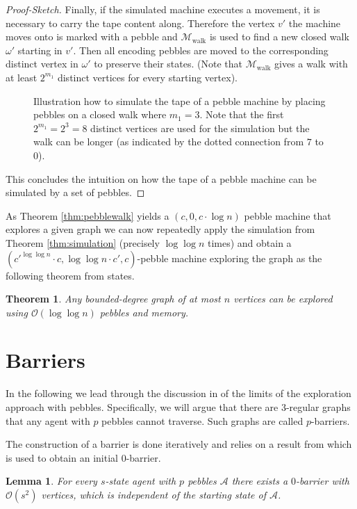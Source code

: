 \documentclass[oneside]{scrartcl}
\newtheorem{thm}{Theorem}
\newtheorem{lem}{Lemma}
\begin{document}
\begin{proof}[Proof-Sketch]
  Finally, if the simulated machine executes a movement, it is necessary to
  carry the tape content along. Therefore the vertex $v'$ the machine moves
  onto is marked with a pebble and $\mathcal{M}_{\text{walk}}$ is used to find
  a new closed walk $\omega'$ starting in $v'$. Then all encoding pebbles are
  moved to the corresponding distinct vertex in $\omega'$ to preserve their
  states. (Note that $\mathcal{M}_{\text{walk}}$ gives a walk with at least
  $2^{m_{1}}$ distinct vertices for every starting vertex).
  \begin{figure}
    \begin{center}
      \resizebox{0.6\textwidth}{!}{}
    \end{center}
    \caption{Illustration how to simulate the tape of a pebble machine by
      placing pebbles on a closed walk where $m_{1} = 3$. Note that the first
      $2^{m_{1}}=2^{3}=8$ distinct vertices are used for the simulation but the
    walk can be longer (as indicated by the dotted connection from $7$ to $0$).}
    \label{fig:tapesim}
  \end{figure}
  This concludes the intuition on how the tape of a pebble machine can be
  simulated by a set of pebbles.
\end{proof}

As Theorem \ref{thm:pebblewalk} yields a $(c,0,c\cdot\log n)$ pebble machine
that explores a given graph we can now repeatedly apply the simulation
from Theorem \ref{thm:simulation} (precisely $\log\log n$ times) and obtain
a $(c'^{\log\log n}\cdot c, \log\log n\cdot c', c)$-pebble machine exploring
the graph as the following theorem from \cite{pebbles} states.
\begin{thm}
  Any bounded-degree graph of at most $n$ vertices can be explored using
  $\mathcal{O}(\log \log n)$ pebbles and memory.
\end{thm}

\section{Barriers}
In the following we lead through the discussion in \cite{pebbles} of the limits
of the exploration approach with pebbles. Specifically, we will argue that
there are 3-regular graphs that any agent with $p$ pebbles cannot traverse.
Such graphs are called $p$-barriers.

The construction of a barrier is done iteratively and relies on a result from
\cite{0barrier} which is used to obtain an initial $0$-barrier.
\begin{lem}
  \label{lem:0bar}
  For every $s$-state agent with $p$ pebbles $\mathcal{A}$ there exists a
  $0$-barrier with $\mathcal{O}(s^{2})$ vertices, which is independent of
  the starting state of $\mathcal{A}$.
\end{lem}
\end{document}
